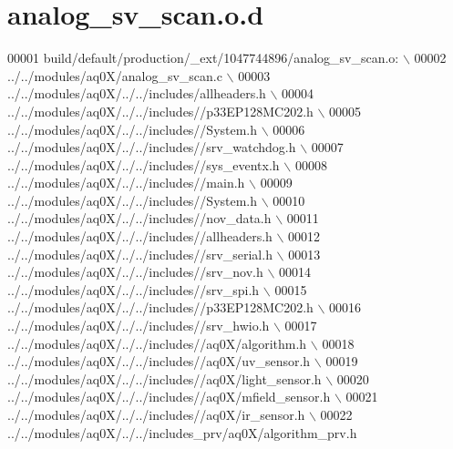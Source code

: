 \hypertarget{a00042_source}{\section{analog\+\_\+sv\+\_\+scan.\+o.\+d}
\label{a00042_source}
}

\begin{DoxyCode}
00001 build/\textcolor{keywordflow}{default}/production/\_ext/1047744896/analog\_sv\_scan.o:  \(\backslash\)
00002  ../../modules/aq0X/analog\_sv\_scan.c  \(\backslash\)
00003 ../../modules/aq0X/../../includes/allheaders.h  \(\backslash\)
00004 ../../modules/aq0X/../../includes\textcolor{comment}{//p33EP128MC202.h  \(\backslash\)}
00005 \textcolor{comment}{../../modules/aq0X/../../includes//System.h  \(\backslash\)}
00006 \textcolor{comment}{../../modules/aq0X/../../includes//srv\_watchdog.h  \(\backslash\)}
00007 \textcolor{comment}{../../modules/aq0X/../../includes//sys\_eventx.h  \(\backslash\)}
00008 \textcolor{comment}{../../modules/aq0X/../../includes//main.h  \(\backslash\)}
00009 \textcolor{comment}{../../modules/aq0X/../../includes//System.h  \(\backslash\)}
00010 \textcolor{comment}{../../modules/aq0X/../../includes//nov\_data.h  \(\backslash\)}
00011 \textcolor{comment}{../../modules/aq0X/../../includes//allheaders.h  \(\backslash\)}
00012 \textcolor{comment}{../../modules/aq0X/../../includes//srv\_serial.h  \(\backslash\)}
00013 \textcolor{comment}{../../modules/aq0X/../../includes//srv\_nov.h  \(\backslash\)}
00014 \textcolor{comment}{../../modules/aq0X/../../includes//srv\_spi.h  \(\backslash\)}
00015 \textcolor{comment}{../../modules/aq0X/../../includes//p33EP128MC202.h  \(\backslash\)}
00016 \textcolor{comment}{../../modules/aq0X/../../includes//srv\_hwio.h  \(\backslash\)}
00017 \textcolor{comment}{../../modules/aq0X/../../includes//aq0X/algorithm.h  \(\backslash\)}
00018 \textcolor{comment}{../../modules/aq0X/../../includes//aq0X/uv\_sensor.h  \(\backslash\)}
00019 \textcolor{comment}{../../modules/aq0X/../../includes//aq0X/light\_sensor.h  \(\backslash\)}
00020 \textcolor{comment}{../../modules/aq0X/../../includes//aq0X/mfield\_sensor.h  \(\backslash\)}
00021 \textcolor{comment}{../../modules/aq0X/../../includes//aq0X/ir\_sensor.h  \(\backslash\)}
00022 \textcolor{comment}{../../modules/aq0X/../../includes\_prv/aq0X/algorithm\_prv.h }
\end{DoxyCode}

